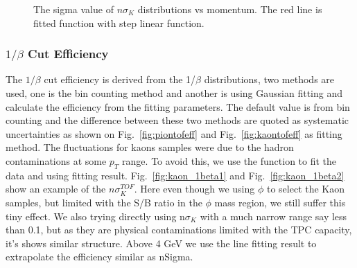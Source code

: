 \begin{figure}[htbp]
\begin{minipage}[htbp]{0.5\linewidth}
\caption{The sigma value of $n\sigma_{K}$ distributions vs momentum. The red line is fitted function with step linear function. \label{fig:kaonsigma}}
\end{minipage}
\end{figure}

\subsubsection{$1/\beta$ Cut Efficiency}
The $1/\beta$ cut efficiency is derived from the 1/$\beta$ distributions, two methods are used, one is the bin counting method and another is using Gaussian fitting and calculate the efficiency from the fitting parameters. The default value is from bin counting and the difference between these two methods are quoted as systematic uncertainties as shown on Fig.~\ref{fig:piontofeff} and Fig.~\ref{fig:kaontofeff} as fitting method. The fluctuations for kaons samples were due to the hadron contaminations at some $p_T$ range. To avoid this, we use the function to fit the data and using fitting result. Fig.~\ref{fig:kaon_1beta1} and Fig.~\ref{fig:kaon_1beta2} show an example of the $n\sigma_{K}^{TOF}$. Here even though we using $\phi$ to select the Kaon samples, but limited with the S/B ratio in the $\phi$ mass region, we still suffer this tiny effect. We also trying directly using n$\sigma_{K}$ with a much narrow range say less than 0.1, but as they are physical contaminations limited with the TPC capacity, it's shows similar structure. Above 4 GeV we use the line fitting result to extrapolate the efficiency similar as nSigma.

